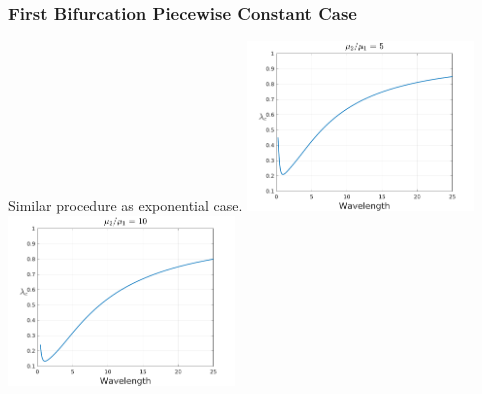\documentclass{beamer}
\begin{document}
\begin{frame}
\frametitle{\large First Bifurcation Piecewise Constant Case}
Similar procedure as exponential case.
		\includegraphics[width=0.45\textwidth]{myFigures/firstBif_lambdac_pieceConst_5}	
		\includegraphics[width=0.45\textwidth]{myFigures/firstBif_lambdac_pieceConst_10}
\end{frame}
\end{document}
